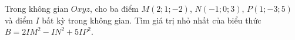\begin{ex}
Trong không gian $Oxyz$, cho ba điểm $M(2;1;-2)$, $N(-1;0;3)$, $P(1;-3;5)$ và điểm $I$ bất kỳ trong không gian. Tìm giá trị nhỏ nhất của biểu thức $B=2IM^2-IN^2+5IP^2$.
\end{ex}
